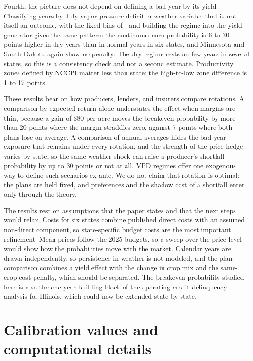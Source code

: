 \documentclass[11pt,letterpaper]{article}
\theoremstyle{remark}
\begin{document}
Fourth, the picture does not depend on defining a bad year by its yield. Classifying years by July vapor-pressure deficit, a weather variable that is not itself an outcome, with the fixed bins of \citet{Pizzo2025}, and building the regime into the yield generator gives the same pattern: the continuous-corn probability is 6 to 30 points higher in dry years than in normal years in six states, and Minnesota and South Dakota again show no penalty. The dry regime rests on few years in several states, so this is a consistency check and not a second estimate. Productivity zones defined by NCCPI matter less than state: the high-to-low zone difference is 1 to 17 points.

These results bear on how producers, lenders, and insurers compare rotations. A comparison by expected return alone understates the effect when margins are thin, because a gain of \$80 per acre moves the breakeven probability by more than 20 points where the margin straddles zero, against 7 points where both plans lose on average. A comparison of annual averages hides the bad-year exposure that remains under every rotation, and the strength of the price hedge varies by state, so the same weather shock can raise a producer's shortfall probability by up to 30 points or not at all. VPD regimes offer one exogenous way to define such scenarios ex ante. We do not claim that rotation is optimal: the plans are held fixed, and preferences and the shadow cost of a shortfall enter only through the theory.

The results rest on assumptions that the paper states and that the next steps would relax. Costs for six states combine published direct costs with an assumed non-direct component, so state-specific budget costs are the most important refinement. Mean prices follow the 2025 budgets, so a sweep over the price level would show how the probabilities move with the market. Calendar years are drawn independently, so persistence in weather is not modeled, and the plan comparison combines a yield effect with the change in crop mix and the same-crop cost penalty, which should be separated. The breakeven probability studied here is also the one-year building block of the operating-credit delinquency analysis for Illinois, which could now be extended state by state.

\appendix

\section{\label{sec:appendix_A}Calibration values and computational details}
\end{document}
